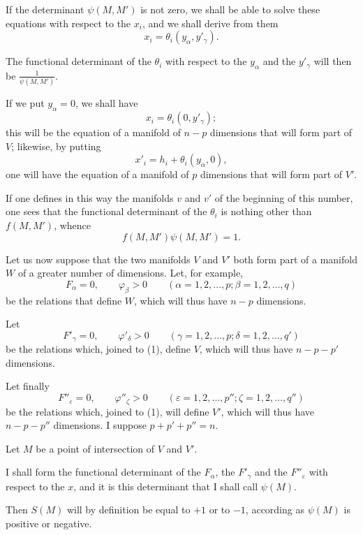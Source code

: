 \documentclass{article}
\begin{document}
If the determinant $\psi(M, M')$ is not zero, we shall be able to solve these
equations with respect to the $x_{i}$, and we shall derive from them
\[
x_{i} = \theta_{i}(y_{\alpha}, y'_{\gamma}).
\]

The functional determinant of the $\theta_{i}$ with respect to the $y_{\alpha}$ and the $y'_{\gamma}$ will then be $\frac{1}{\psi(M, M')}$.

If we put $y_{\alpha} = 0$, we shall have
\[
x_{i} = \theta_{i}(0, y'_{\gamma});
\]
this will be the equation of a manifold of $n-p$ dimensions that will form part of $V$; likewise, by putting
\[
x'_{i} = h_{i} + \theta_{i}(y_{\alpha}, 0),
\]
one will have the equation of a manifold of $p$ dimensions that will form part of $V'$.

If one defines in this way the manifolds $v$ and $v'$ of the beginning of this number, one sees that the functional determinant of the $\theta_{i}$ is nothing other than $f(M, M')$, whence
\[
f(M, M')\psi(M, M') = 1.
\]

Let us now suppose that the two manifolds $V$ and $V'$ both form part of a manifold $W$ of a greater number of dimensions. Let, for example,
\[
F_{\alpha} = 0, \qquad \varphi_{\beta} > 0 \qquad (\alpha = 1, 2, \ldots, p; \beta = 1, 2, \ldots, q) \tag{1}
\]
be the relations that define $W$, which will thus have $n-p$ dimensions.

Let
\[
F'_{\gamma} = 0, \qquad \varphi'_{\delta} > 0 \qquad (\gamma = 1, 2, \ldots, p; \delta = 1, 2, \ldots, q') \tag{2}
\]
 be the relations which, joined to (1), define $V$, which will thus have $n-p-p'$ dimensions.

Let finally
\[
F''_{\varepsilon} = 0, \qquad \varphi''_{\zeta} > 0 \qquad (\varepsilon = 1, 2, \ldots, p''; \zeta = 1, 2, \ldots, q'') \tag{3}
\]
be the relations which, joined to (1), will define $V'$, which will thus have $n-p-p''$ dimensions. I suppose $p + p' + p'' = n$.

Let $M$ be a point of intersection of $V$ and $V'$.

I shall form the functional determinant of the $F_{\alpha}$, the $F'_{\gamma}$ and the $F''_{\varepsilon}$ with respect to the $x$, and it is this determinant that I shall call $\psi(M)$.

Then $S(M)$ will by definition be equal to $+1$ or to $-1$, according as $\psi(M)$ is positive or negative.
\end{document}
